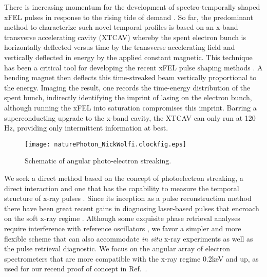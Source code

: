 
There is increasing momentum for the development of spectro-temporally shaped xFEL pulses \cite{eehg2009,Lutman13_twocolor,Marinelli13_twocolor,Allaria2014,Marinelli2015,Hemsing2016,Prince2016,Lutman2016,LutmanFreshSlice2016,Marinelli2016} in response to the rising tide of demand \cite{Cederbaum2008,Mukamel2007,Biggs2012,Mukamel2013,4WaveMixing,TIGER2015,ArtemFOA}.
So far, the predominant method to characterize such novel temporal profiles is based on an x-band transverse accelerating cavity (XTCAV) \cite{xtcav2014} whereby the spent electron bunch is horizontally deflected versus time by the transverse accelerating field and vertically deflected in energy by the applied constant magnetic.
This technique has been a critical tool for developing the recent xFEL pulse shaping methods \cite{Ding2015,Marinelli2015,Marinelli2016,LutmanFreshSlice2016,Lutman2016}.
A bending magnet then deflects this time-streaked beam vertically proportional to the energy.
Imaging the result, one records the time-energy distribution of the spent bunch, indirectly identifying the imprint of lasing on the electron bunch, although running the xFEL into saturation compromises this imprint.
Barring a superconducting upgrade to the x-band cavity, the XTCAV can only run at 120 Hz, providing only intermittent information at best.

\begin{figure}[b]
\vspace{-\baselineskip}
\centerline{
	\texttt{[image: naturePhoton\_NickWolfi.clockfig.eps]}
}
\vspace{-\baselineskip}
\caption{
	\label{streakingschematic} 
	Schematic of angular photo-electron streaking. \cite{Nick2018}
}
\end{figure}
We seek a direct method based on the concept of photoelectron streaking, a direct interaction and one that has the capability to measure the temporal structure of x-ray pulses \cite{Hentschel2001}.
Since its inception as a pulse reconstruction method \cite{Zenghu2005,KellerAngularStreaking} there have been great recent gains in diagnosing laser-based pulses that encroach on the soft x-ray regime \cite{Biegert2016,WornerSci2017,HJWorner2017}.
Although some exquisite phase retrieval analyses require interference with reference oscillators \cite{Zenghu2010,Cocke2013}, we favor a simpler and more flexible scheme that can also accommodate \textit{in situ} x-ray experiments as well as the pulse retrieval diagnostic.
We focus on the angular array of electron spectrometers that are more compatible with the x-ray regime 0.2keV and up, as used for our recend proof of concept in Ref.~\cite{Nick2018}.

